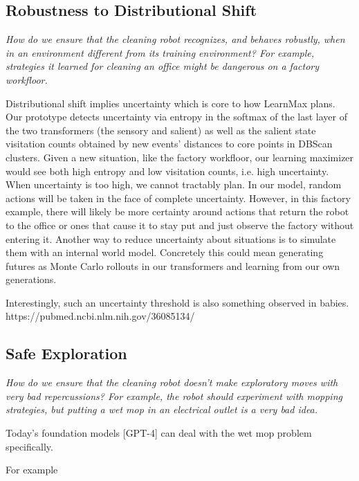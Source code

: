 \documentclass{article}
\begin{document}
\subsection{Robustness to Distributional Shift}
\textit{How do we ensure that the cleaning robot recognizes,
and behaves robustly, when in an environment different from its training environment? For example, strategies it learned for cleaning an office might be dangerous on a factory workfloor.}

\hspace{}

Distributional shift implies uncertainty which is core to how LearnMax plans. Our prototype detects uncertainty via entropy in the softmax of the last layer of the two transformers (the sensory and salient) as well as the salient state visitation counts obtained by new events' distances to core points in DBScan clusters. Given a new situation, like the factory workfloor, our learning maximizer would see both high entropy and low visitation counts, i.e. high uncertainty. When uncertainty is too high, we cannot tractably plan. In our model, random actions will be taken in the face of complete uncertainty. However, in this factory example, there will likely be more certainty around actions that return the robot to the office or ones that cause it to stay put and just observe the factory without entering it. Another way to reduce uncertainty about situations is to simulate them with an internal world model. Concretely this could mean generating futures as Monte Carlo rollouts in our transformers and learning from our own generations. \cite{jang2023reflection}

Interestingly, such an uncertainty threshold is also something observed in babies. https://pubmed.ncbi.nlm.nih.gov/36085134/

\subsection{Safe Exploration}
\textit{How do we ensure that the cleaning robot doesn’t make exploratory
moves with very bad repercussions? For example, the robot should experiment with mopping strategies, but putting a wet mop in an electrical outlet is a very bad idea.}

\hspace{}

Today's foundation models [GPT-4] can deal with the wet mop problem specifically.

For example
\end{document}
